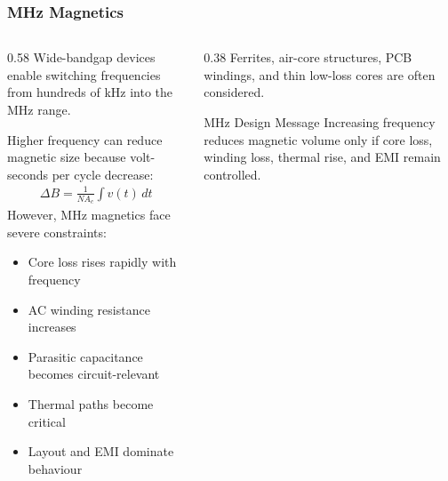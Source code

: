 \begin{frame}
    \frametitle{MHz Magnetics}

    \begin{columns}
        \begin{column}{0.58\textwidth}
            Wide-bandgap devices enable switching frequencies from hundreds of kHz into the MHz range.

            Higher frequency can reduce magnetic size because volt-seconds per cycle decrease:
            \begin{align}
                \Delta B =
                \frac{1}{N A_c}\int v(t)\,dt
            \end{align}
            However, MHz magnetics face severe constraints:
            \begin{itemize}
                \item Core loss rises rapidly with frequency
                \item AC winding resistance increases
                \item Parasitic capacitance becomes circuit-relevant
                \item Thermal paths become critical
                \item Layout and EMI dominate behaviour
            \end{itemize}
        \end{column}
        \begin{column}{0.38\textwidth}
            Ferrites, air-core structures, PCB windings, and thin low-loss cores are often considered.
            \begin{block}{MHz Design Message}
                \small
                Increasing frequency reduces magnetic volume only if core loss, winding loss, thermal rise, and EMI remain controlled.
            \end{block}
        \end{column}
    \end{columns}
\end{frame}


